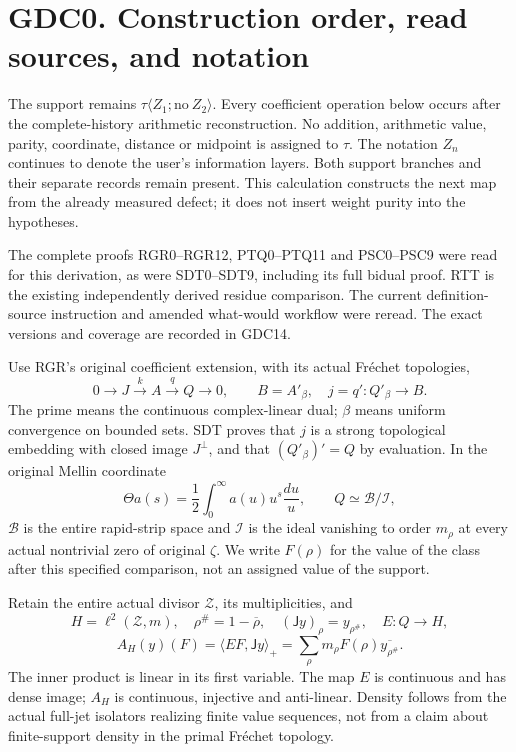 \section{GDC0. Construction order, read sources, and
notation}\label{gdc0.-construction-order-read-sources-and-notation}

The support remains \(\tau\langle Z_1;\mathrm{no}\ Z_2\rangle\). Every
coefficient operation below occurs after the complete-history arithmetic
reconstruction. No addition, arithmetic value, parity, coordinate,
distance or midpoint is assigned to \(\tau\). The notation \(Z_n\)
continues to denote the user's information layers. Both support branches
and their separate records remain present. This calculation constructs
the next map from the already measured defect; it does not insert weight
purity into the hypotheses.

The complete proofs RGR0--RGR12, PTQ0--PTQ11 and PSC0--PSC9 were read
for this derivation, as were SDT0--SDT9, including its full bidual
proof. RTT is the existing independently derived residue comparison. The
current definition-source instruction and amended what-would workflow
were reread. The exact versions and coverage are recorded in GDC14.

Use RGR's original coefficient extension, with its actual Fréchet
topologies, \[
0\longrightarrow J\xrightarrow{k}A\xrightarrow{q}Q\longrightarrow0,
\qquad B=A'_\beta,\quad j=q':Q'_\beta\longrightarrow B.
\tag{GDC0.1}
\] The prime means the continuous complex-linear dual; \(\beta\) means
uniform convergence on bounded sets. SDT proves that \(j\) is a strong
topological embedding with closed image \(J^\perp\), and that
\((Q'_\beta)'=Q\) by evaluation. In the original Mellin coordinate \[
\Theta a(s)=\frac12\int_0^\infty a(u)u^s\frac{du}{u},
\qquad Q\simeq\mathcal B/\mathcal I,
\tag{GDC0.2}
\] \(\mathcal B\) is the entire rapid-strip space and \(\mathcal I\) is
the ideal vanishing to order \(m_\rho\) at every actual nontrivial zero
of original \(\zeta\). We write \(F(\rho)\) for the value of the class
after this specified comparison, not an assigned value of the support.

Retain the entire actual divisor \(\mathscr Z\), its multiplicities, and
\[
H=\ell^2(\mathscr Z,m),\quad \rho^\#=1-\overline\rho,
\quad (\mathsf Jy)_\rho=y_{\rho^\#},\quad
E:Q\to H,
\] \[
A_H(y)(F)=\langle EF,\mathsf Jy\rangle_+
=\sum_\rho m_\rho F(\rho)\overline{y_{\rho^\#}}.
\tag{GDC0.3}
\] The inner product is linear in its first variable. The map \(E\) is
continuous and has dense image; \(A_H\) is continuous, injective and
anti-linear. Density follows from the actual full-jet isolators
realizing finite value sequences, not from a claim about finite-support
density in the primal Fréchet topology.

